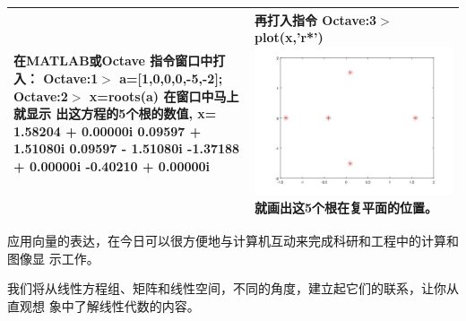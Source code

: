 \songti
\begin{center}%
\begin{tabular}{|p{150 pt}|p{150 pt}|}
\hline
\makecell[c]{在MATLAB或Octave\\
	指令窗口中打入：\\
Octave:1$ > $  a=[1,0,0,0,-5,-2];\\
Octave:2$ > $  x=roots(a)\\
在窗口中马上就显示\\
出这方程的5个根的数值,\\
x= \\
1.58204 +  0.00000i\\
0.09597  + 1.51080i\\
0.09597  - 1.51080i\\
-1.37188  + 0.00000i\\
-0.40210  + 0.00000i\\}
&
\makecell[c]{再打入指令\\
Octave:3$ > $  plot(x,'r*')\\
\includegraphics[width = .4\textwidth]{pic/163122zo5tmql5otmldxtf.jpg}\\
就画出这5个根在复平面的位置。}
\\
\hline
\end{tabular}
\end{center}



\kaishu
应用向量的表达，在今日可以很方便地与计算机互动来完成科研和工程中的计算和图像显
示工作。

\songti
\par
我们将从线性方程组、矩阵和线性空间，不同的角度，建立起它们的联系，让你从直观想
象中了解线性代数的内容。
